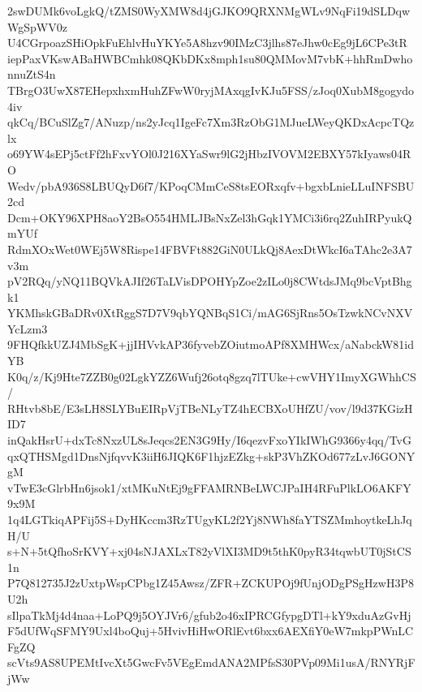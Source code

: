 2swDUMk6voLgkQ/tZMS0WyXMW8d4jGJKO9QRXNMgWLv9NqFi19dSLDqwWgSpWV0z
U4CGrpoazSHiOpkFuEhlvHuYKYe5A8hzv90IMzC3jlhs87eJhw0cEg9jL6CPe3tR
iepPaxVKswABaHWBCmhk08QKbDKx8mph1su80QMMovM7vbK+hhRmDwhonnuZtS4n
TBrgO3UwX87EHepxhxmHuhZFwW0ryjMAxqgIvKJu5FSS/zJoq0XubM8gogydo4iv
qkCq/BCuSlZg7/ANuzp/ns2yJcq1IgeFc7Xm3RzObG1MJueLWeyQKDxAcpcTQzlx
o69YW4sEPj5ctFf2hFxvYOl0J216XYaSwr9lG2jHbzIVOVM2EBXY57kIyaws04RO
Wedv/pbA936S8LBUQyD6f7/KPoqCMmCeS8tsEORxqfv+bgxbLnieLLuINFSBU2cd
Dcm+OKY96XPH8aoY2BsO554HMLJBsNxZel3hGqk1YMCi3i6rq2ZuhIRPyukQmYUf
RdmXOxWet0WEj5W8Rispe14FBVFt882GiN0ULkQj8AexDtWkcI6aTAhc2e3A7v3m
pV2RQq/yNQ11BQVkAJIf26TaLVisDPOHYpZoe2zILo0j8CWtdsJMq9bcVptBhgk1
YKMhskGBaDRv0XtRggS7D7V9qbYQNBqS1Ci/mAG6SjRns5OsTzwkNCvNXVYcLzm3
9FHQfkkUZJ4MbSgK+jjIHVvkAP36fyvebZOiutmoAPf8XMHWcx/aNabckW81idYB
K0q/z/Kj9Hte7ZZB0g02LgkYZZ6Wufj26otq8gzq7lTUke+cwVHY1ImyXGWhhCS/
RHtvb8bE/E3sLH8SLYBuEIRpVjTBeNLyTZ4hECBXoUHfZU/vov/l9d37KGizHID7
inQakHsrU+dxTc8NxzUL8sJeqcs2EN3G9Hy/I6qezvFxoYIkIWhG9366y4qq/TvG
qxQTHSMgd1DnsNjfqvvK3iiH6JIQK6F1hjzEZkg+skP3VhZKOd677zLvJ6GONYgM
vTwE3cGlrbHn6jsok1/xtMKuNtEj9gFFAMRNBeLWCJPaIH4RFuPlkLO6AKFY9x9M
1q4LGTkiqAPFij5S+DyHKccm3RzTUgyKL2f2Yj8NWh8faYTSZMmhoytkeLhJqH/U
s+N+5tQfhoSrKVY+xj04sNJAXLxT82yVlXI3MD9t5thK0pyR34tqwbUT0jStCS1n
P7Q812735J2zUxtpWspCPbg1Z45Awsz/ZFR+ZCKUPOj9fUnjODgPSgHzwH3P8U2h
sIlpaTkMj4d4naa+LoPQ9j5OYJVr6/gfub2o46xIPRCGfypgDTl+kY9xduAzGvHj
F5dUfWqSFMY9Uxl4boQuj+5HvivHiHwORlEvt6bxx6AEXfiY0eW7mkpPWnLCFgZQ
scVts9AS8UPEMtIvcXt5GwcFv5VEgEmdANA2MPfsS30PVp09Mi1usA/RNYRjFjWw
